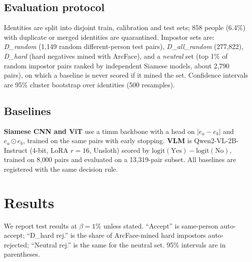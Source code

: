 \documentclass[10pt,twocolumn]{article}
\begin{document}
\subsection{Evaluation protocol}
Identities are split into disjoint train, calibration and test sets; 858 people (6.4\%) with duplicate or merged identities are quarantined. Impostor sets are: \emph{D\_random} (1{,}149 random different-person test pairs), \emph{D\_all\_random} (277{,}822), \emph{D\_hard} (hard negatives mined with ArcFace), and a \emph{neutral} set (top 1\% of random impostor pairs ranked by independent Siamese models, about 2{,}790 pairs), on which a baseline is never scored if it mined the set. Confidence intervals are 95\% cluster bootstrap over identities (500 resamples).

\subsection{Baselines}
\textbf{Siamese CNN and ViT} use a timm backbone with a head on $|e_a-e_b|$ and $e_a\odot e_b$, trained on the same pairs with early stopping. \textbf{VLM} is Qwen2-VL-2B-Instruct (4-bit, LoRA $r=16$, Unsloth) scored by $\mathrm{logit}(\text{Yes})-\mathrm{logit}(\text{No})$, trained on 8{,}000 pairs and evaluated on a 13{,}319-pair subset. All baselines are registered with the same decision rule.

\section{Results}
We report test results at $\beta=1\%$ unless stated. ``Accept'' is same-person auto-accept; ``D\_hard rej.'' is the share of ArcFace-mined hard impostors auto-rejected; ``Neutral rej.'' is the same for the neutral set. 95\% intervals are in parentheses.
\end{document}
